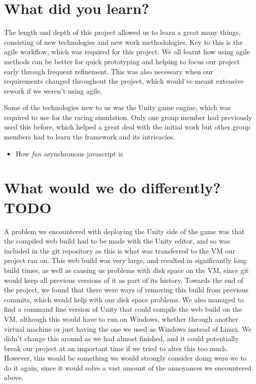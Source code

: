\section{What did you learn?}

The length and depth of this project allowed us to learn a great many things,
consisting of new technologies and new work methodologies. Key to this is the
agile workflow, which was required for this project. We all learnt how using
agile methods can be better for quick prototyping and helping to focus our
project early through frequent refinement. This was also necessary when our
requirements changed throughout the project, which would've meant extensive
rework if we weren't using agile.

Some of the technologies new to us was the Unity game engine, which was required
to use for the racing simulation. Only one group member had previously used this
before, which helped a great deal with the initial work but other group members
had to learn the framework and its intricacies. 

\begin{itemize}
    \item
        How \textit{fun} asynchronous javascript is
\end{itemize}

\section{What would we do differently? TODO}

A problem we encountered with deploying the Unity side of the game was that the
compiled web build had to be made with the Unity editor, and so was included in
the git repository as this is what was transferred to the VM our project ran on.
This web build was very large, and resulted in significantly long build times,
as well as causing us problems with disk space on the VM, since git would keep
all previous versions of it as part of its history. Towards the end of the
project, we found that there were ways of removing this build from previous
commits, which would help with our disk space problems. We also managed to find
a command line version of Unity that could compile the web build on the VM,
although this would have to run on Windows, whether through another virtual
machine or just having the one we used as Windows instead of Linux. We didn't
change this around as we had almost finished, and it could potentially break our
project at an important time if we tried to alter this too much. However, this
would be something we would strongly consider doing were we to do it again,
since it would solve a vast amount of the annoyances we encountered above.

